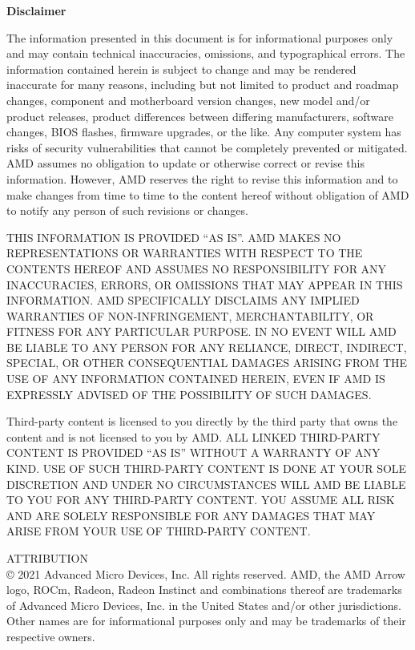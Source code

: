 \documentclass[10pt,aspectratio=169]{beamer}
\begin{document}
\begin{frame}
  \textbf{Disclaimer}
  \medskip

  \fontsize{8pt}{8pt}\selectfont
  The information presented in this document is for informational
  purposes only and may contain technical inaccuracies, omissions, and
  typographical errors. The information contained herein is subject to
  change and may be rendered inaccurate for many reasons, including
  but not limited to product and roadmap changes, component and
  motherboard version changes, new model and/or product releases,
  product differences between differing manufacturers, software
  changes, BIOS flashes, firmware upgrades, or the like. Any computer
  system has risks of security vulnerabilities that cannot be
  completely prevented or mitigated.  AMD assumes no obligation to
  update or otherwise correct or revise this information. However, AMD
  reserves the right to revise this information and to make changes
  from time to time to the content hereof without obligation of AMD to
  notify any person of such revisions or changes.
  \medskip
 
  THIS INFORMATION IS PROVIDED ``AS IS''. AMD MAKES NO REPRESENTATIONS
  OR WARRANTIES WITH RESPECT TO THE CONTENTS HEREOF AND ASSUMES NO
  RESPONSIBILITY FOR ANY INACCURACIES, ERRORS, OR OMISSIONS THAT MAY
  APPEAR IN THIS INFORMATION. AMD SPECIFICALLY DISCLAIMS ANY IMPLIED
  WARRANTIES OF NON-INFRINGEMENT, MERCHANTABILITY, OR FITNESS FOR ANY
  PARTICULAR PURPOSE. IN NO EVENT WILL AMD BE LIABLE TO ANY PERSON FOR
  ANY RELIANCE, DIRECT, INDIRECT, SPECIAL, OR OTHER CONSEQUENTIAL
  DAMAGES ARISING FROM THE USE OF ANY INFORMATION CONTAINED HEREIN,
  EVEN IF AMD IS EXPRESSLY ADVISED OF THE POSSIBILITY OF SUCH DAMAGES.
  \medskip
    
  Third-party content is licensed to you directly by the third party
  that owns the content and is not licensed to you by AMD.  ALL LINKED
  THIRD-PARTY CONTENT IS PROVIDED “AS IS” WITHOUT A WARRANTY OF ANY
  KIND.  USE OF SUCH THIRD-PARTY CONTENT IS DONE AT YOUR SOLE
  DISCRETION AND UNDER NO CIRCUMSTANCES WILL AMD BE LIABLE TO YOU FOR
  ANY THIRD-PARTY CONTENT.  YOU ASSUME ALL RISK AND ARE SOLELY
  RESPONSIBLE FOR ANY DAMAGES THAT MAY ARISE FROM YOUR USE OF
  THIRD-PARTY CONTENT.
  \medskip

  ATTRIBUTION\\
  © 2021 Advanced Micro Devices, Inc. All rights
  reserved. AMD, the AMD Arrow logo, ROCm, Radeon, Radeon Instinct and
  combinations thereof are trademarks of Advanced Micro Devices,
  Inc. in the United States and/or other jurisdictions. Other names
  are for informational purposes only and may be trademarks of their
  respective owners.
  
\end{frame}
  
\end{document}
